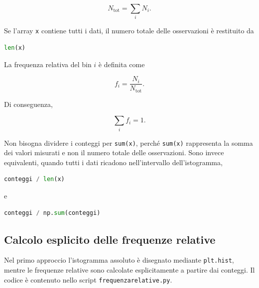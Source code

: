 \documentclass[11pt,a4paper]{book}
\begin{document}
\begin{equation}
N_{\mathrm{tot}}=\sum_i N_i.
\end{equation}

Se l'array \texttt{x} contiene tutti i dati, il numero totale delle
osservazioni è restituito da

\begin{lstlisting}[language=Python]
len(x)
\end{lstlisting}

La frequenza relativa del bin $i$ è definita come

\begin{equation}
f_i=\frac{N_i}{N_{\mathrm{tot}}}.
\end{equation}

Di conseguenza,

\begin{equation}
\sum_i f_i=1.
\end{equation}

Non bisogna dividere i conteggi per \texttt{sum(x)}, perché
\texttt{sum(x)} rappresenta la somma dei valori misurati e non il numero
totale delle osservazioni. Sono invece equivalenti, quando tutti i dati
ricadono nell'intervallo dell'istogramma,

\begin{lstlisting}[language=Python]
conteggi / len(x)
\end{lstlisting}

e

\begin{lstlisting}[language=Python]
conteggi / np.sum(conteggi)
\end{lstlisting}

\subsection{Calcolo esplicito delle frequenze relative}

Nel primo approccio l'istogramma assoluto è disegnato mediante
\texttt{plt.hist}, mentre le frequenze relative sono calcolate
esplicitamente a partire dai conteggi. Il codice è contenuto nello script
\texttt{frequenzarelative.py}.
\end{document}
